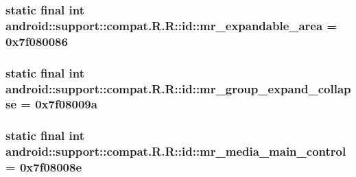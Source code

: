 \hypertarget{classandroid_1_1support_1_1compat_1_1_r_1_1id_086cce5f12d65e3e956a1c7479c21823}{
\subsubsection[{mr\_\-expandable\_\-area}]{\setlength{\rightskip}{0pt plus 5cm}static final int android::support::compat.R.R::id::mr\_\-expandable\_\-area = 0x7f080086}}
\label{classandroid_1_1support_1_1compat_1_1_r_1_1id_086cce5f12d65e3e956a1c7479c21823}


\hypertarget{classandroid_1_1support_1_1compat_1_1_r_1_1id_19ac12ef7bb92ca85944ddb64cb0ed92}{
\subsubsection[{mr\_\-group\_\-expand\_\-collapse}]{\setlength{\rightskip}{0pt plus 5cm}static final int android::support::compat.R.R::id::mr\_\-group\_\-expand\_\-collapse = 0x7f08009a}}
\label{classandroid_1_1support_1_1compat_1_1_r_1_1id_19ac12ef7bb92ca85944ddb64cb0ed92}


\hypertarget{classandroid_1_1support_1_1compat_1_1_r_1_1id_81ac96aff866e09849077bb29ecb0565}{
\subsubsection[{mr\_\-media\_\-main\_\-control}]{\setlength{\rightskip}{0pt plus 5cm}static final int android::support::compat.R.R::id::mr\_\-media\_\-main\_\-control = 0x7f08008e}}
\label{classandroid_1_1support_1_1compat_1_1_r_1_1id_81ac96aff866e09849077bb29ecb0565}


